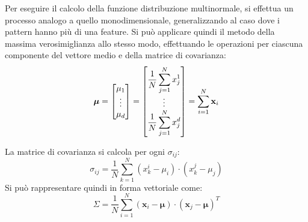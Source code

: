 \documentclass{article}
\numberwithin{equation}{subsection}
\newcommand{\vect}[1]{\boldsymbol{\mathbf{#1}}}
\begin{document}
Per eseguire il calcolo della funzione distribuzione multinormale, si effettua un processo analogo a quello monodimensionale, generalizzando al caso dove i pattern hanno più di una feature. 
Si può applicare quindi il metodo della massima verosimiglianza allo stesso modo, effettuando le operazioni per ciascuna componente del vettore medio e della matrice di covarianza:
\begin{equation}
    \vect{\mu}=\begin{bmatrix}
        \strut\mu_1\\\vdots\\\strut\mu_d
    \end{bmatrix}=\begin{bmatrix}
        \displaystyle\frac{1}{N}\sum_{j=1}^Nx_j^1\\\vdots\\
        \displaystyle\frac{1}{N}\sum_{j=1}^Nx_j^d
    \end{bmatrix}=\displaystyle\sum_{i=1}^N\vect{x}_i
\end{equation}

La matrice di covarianza si calcola per ogni $\sigma_{ij}$:
\begin{equation*}
    \sigma_{ij}=\displaystyle\frac{1}{N}\sum_{k=1}^N(x_k^i-\mu_i)\cdot(x_k^j-\mu_j)
\end{equation*}
Si può rappresentare quindi in forma vettoriale come:
\begin{equation}
    \Sigma=\displaystyle\frac{1}{N}\sum_{i=1}^N(\vect{x}_i-\vect{\mu})\cdot(\vect{x}_j-\vect{\mu})^T
\end{equation}
\end{document}
